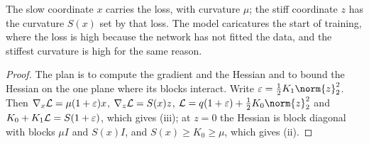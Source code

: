 \begin{refsection}
The slow coordinate $x$ carries the loss, with curvature $\mu$; the stiff coordinate $z$ has the curvature $S(x)$ set by that loss. The model caricatures the start of training, where the loss is high because the network has not fitted the data, and the stiffest curvature is high for the same reason.


\begin{proof}
The plan is to compute the gradient and the Hessian and to bound the Hessian on the one plane where its blocks interact. Write $\varepsilon=\frac12K_1\norm{z}_2^2$. Then $\nabla_x\mathcal{L}=\mu(1+\varepsilon)x$, $\nabla_z\mathcal{L}=S(x)z$, $\Loss=q(1+\varepsilon)+\frac12K_0\norm{z}_2^2$ and $K_0+K_1\mathcal{L}=S(1+\varepsilon)$, which gives (iii); at $z=0$ the Hessian is block diagonal with blocks $\mu I$ and $S(x)I$, and $S(x)\ge K_0\ge\mu$, which gives (ii).


\end{proof}
\end{refsection}

